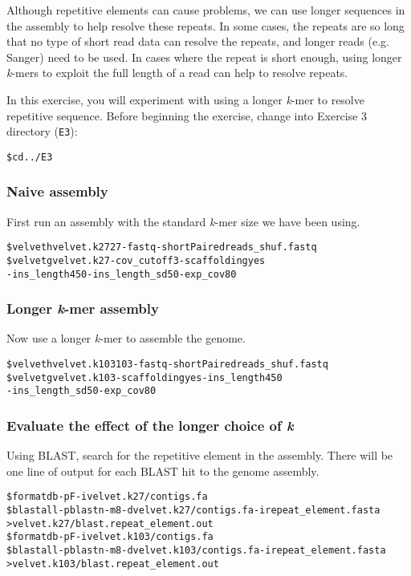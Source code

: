 \documentclass[11pt,a4paper]{scrartcl}
\begin{document}
Although repetitive elements can cause problems, we can use longer sequences in
the assembly to help resolve these repeats. In some cases, the repeats are so
long that no type of short read data can resolve the repeats, and longer reads
(e.g. Sanger) need to be used. In cases where the repeat is short enough, using
longer \emph{k}-mers to exploit the full length of a read can help to resolve repeats.

In this exercise, you will experiment with using a longer \emph{k}-mer to resolve
repetitive sequence. Before beginning the exercise, change into Exercise 3
directory (\texttt{E3}):

\begin{alltt}
    \$ cd ../E3
\end{alltt}
\subsubsection{Naive assembly}
First run an assembly with the standard \emph{k}-mer size we have been using.
\begin{alltt}
    \$ velveth velvet.k27 27 -fastq -shortPaired reads_shuf.fastq
    \$ velvetg velvet.k27 -cov_cutoff 3 -scaffolding yes 
      -ins_length 450 -ins_length_sd 50 -exp_cov 80
\end{alltt}

\subsubsection{Longer \emph{k}-mer assembly}
Now use a longer \emph{k}-mer to assemble the genome.
\begin{alltt}
    \$ velveth velvet.k103 103 -fastq -shortPaired reads_shuf.fastq
    \$ velvetg velvet.k103 -scaffolding yes -ins_length 450 
      -ins_length_sd 50 -exp_cov 80
\end{alltt}

\subsubsection{Evaluate the effect of the longer choice of \emph{k}}
Using BLAST, search for the repetitive element in the assembly.  There will be
one line of output for each BLAST hit to the genome assembly.
\begin{alltt}
    \$ formatdb -p F -i velvet.k27/contigs.fa
    \$ blastall -p blastn -m 8 -d velvet.k27/contigs.fa -i repeat_element.fasta 
      > velvet.k27/blast.repeat_element.out
    \$ formatdb -p F -i velvet.k103/contigs.fa
    \$ blastall -p blastn -m 8 -d velvet.k103/contigs.fa -i repeat_element.fasta
      > velvet.k103/blast.repeat_element.out
\end{alltt}
\end{document}
